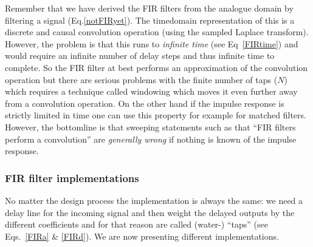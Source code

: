\documentclass[12pt,a4paper]{article}
\begin{document}
Remember that we have derived the FIR filters from the analogue domain
by filtering a signal (Eq.\ref{notFIRyet}). The timedomain
representation of this is a discrete and causal convolution operation
(using the sampled Laplace transform). However, the problem is that
this runs to \textsl{infinite time} (see Eq~\ref{FIRtime}) and would
require an infinite number of delay steps and thus infinite time to
complete. So the FIR filter at best performs an approximation of the
convolution operation but there are serious problems with the finite
number of taps ($N$) which requires a technique called windowing which
moves it even further away from a convolution operation. On the other
hand if the impulse response is strictly limited in time one can use
this property for example for matched filters. However, the bottomline
is that sweeping statements such as that ``FIR filters perform a
convolution'' are \textsl{generally wrong} if nothing is known of the
impulse response.



\subsubsection{FIR filter implementations}
No matter the design process the implementation is always the same: we
need a delay line for the incoming signal and then weight the delayed
outputs by the different coefficients and for that reason are called
(water-) ``taps'' (see Eqs.~\ref{FIRa} \& \ref{FIRd}). We are now presenting
different implementations.
\end{document}
